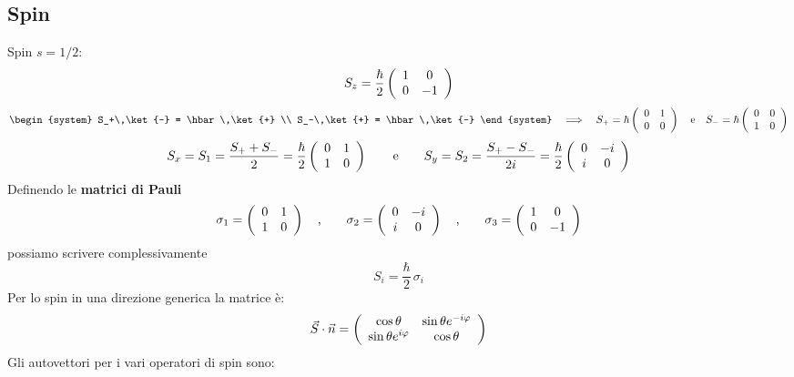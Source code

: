\subsection{Spin}



Spin $s = 1/2$:
$$ S_z = \frac{\hbar}{2}\matrice{2}{1&0\\0&-1} $$
\begin{equation}
	\label{spin:inn_abb:mah}
	\begin{system}
		S_+\,\ket{-} = \hbar\,\ket{+} \\ S_-\,\ket{+} = \hbar\,\ket{-}
	\end{system}
	\quad \Longrightarrow \quad
	S_+ = \hbar\matrice{2}{0 & 1 \\ 0 & 0} \quad \mbox{e} \quad S_- = \hbar\matrice{2}{0 & 0 \\ 1 & 0}
\end{equation}
\begin{equation}
	\label{spin:S1_S2}
	S_x = S_1 = \frac{S_+ + S_-}{2} = \frac{\hbar}{2}\matrice{2}{0 & 1 \\ 1 & 0}
	\qquad \mbox{e} \qquad
	S_y = S_2 = \frac{S_+ - S_-}{2i} = \frac{\hbar}{2}\matrice{2}{0 & -i \\ i & 0}
\end{equation}
%
Definendo le \textbf{matrici di Pauli}
\begin{equation}
	\label{mat_pauli}
	\sigma_1 = \matrice{2}{0&1\\1&0}\quad \mbox{,} \qquad
	\sigma_2 = \matrice{2}{0&-i\\i&0}\quad \mbox{,} \qquad
	\sigma_3 = \matrice{2}{1&0\\0&-1}
\end{equation}
possiamo scrivere complessivamente
\begin{equation}
	\label{spin:S123} \boxed{\quad S_i = \frac{\hbar}{2}\,\sigma_i \quad }
\end{equation}
Per lo spin in una direzione generica la matrice è:
$$
	\vec{S}\cdot{\vec{n}} = \matrice{2}{\cos{\theta} & \sin{\theta}e^{-i{\varphi} } \\
	\sin{\theta}e^{i{\varphi}} & \cos{\theta} }
$$
Gli autovettori per i vari operatori di spin sono:
